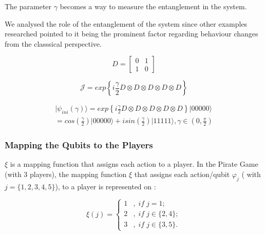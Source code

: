 \documentclass[10pt]{llncs}
\begin{document}
The parameter $\gamma$ becomes a way to measure the entanglement in the system\cite{Eisert2008}. 

We analysed the role of the entanglement of the system since other examples researched pointed to it being the prominent factor regarding behaviour changes from the classsical perspective\cite{Fra2011a}\cite{Fra2011}\cite{Letters2002}\cite{Khan2011}\cite{Ricketts2006}. 


\begin{equation}
D=\left[\begin{array}{cc}
0 & 1\\
1 & 0
\end{array}\right]
\label{eq:DDDDDDDrica}
\end{equation} 



\begin{equation}
\mathcal{J}=exp\left\{ i\frac{\gamma}{2} D \otimes D \otimes D \otimes D 
\otimes D
\right\} 
\label{eq:matrix_exponencial_esoterica}
\end{equation} 

\begin{center}
\begin{equation}
\begin{split}
\vert\psi_{ini}(\gamma)\rangle=exp\left\{ i\frac{\gamma}{2} D \otimes D \otimes D \otimes D 
\otimes D\right\} \vert00000\rangle \\
=cos(\frac{\gamma}{2})\vert00000\rangle+isin(\frac{\gamma}{2})\vert11111\rangle,\gamma\in(0,\frac{\pi}{2})
 \end{split}
\label{eq:estado_inicial_pg}
\end{equation}
\end{center}


\subsubsection{Mapping the Qubits to the Players} $\xi$ is a mapping function that assigns each action to a player. In the Pirate Game (with $3$ players), the mapping function $\xi$ that assigns each action/qubit $\varphi_{j}$ ( with $j=\{ 1, 2, 3, 4, 5\}$), to a player is represented on :

\begin{equation}
\xi(j)=\begin{cases}
1 & ,\; if\; j=1;\\
2 & ,\; if\; j\in\{2,4\};\\
3 & ,\; if\; j\in\{3,5\}.
\end{cases}
\label{playerxiximapping}
\end{equation}
\end{document}
